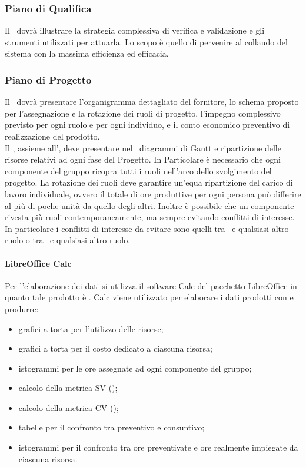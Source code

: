 \documentclass[12pt,a4paper]{article}
\begin{document}
\subsubsection{Piano di Qualifica}
Il \PdQ\ dovrà illustrare la strategia complessiva di verifica e validazione e gli strumenti utilizzati per attuarla. Lo scopo è quello di pervenire al collaudo del sistema con la massima efficienza ed efficacia.

\subsubsection{Piano di Progetto} %
Il \PdP\ dovrà presentare l'organigramma dettagliato del fornitore, lo schema proposto per l'assegnazione e la rotazione dei ruoli di progetto, l'impegno complessivo previsto per ogni ruolo e per ogni individuo, e il conto economico preventivo di realizzazione del prodotto.\\
Il \PM, assieme all'\AM, deve presentare nel \PdP\ diagrammi di Gantt e ripartizione delle risorse relativi ad ogni fase del Progetto. In Particolare è necessario che ogni componente del gruppo ricopra tutti i ruoli nell'arco dello svolgimento del progetto. La rotazione dei ruoli deve garantire un'equa ripartizione del carico di lavoro individuale, ovvero il totale di ore produttive per ogni persona può differire al più di poche unità da quello degli altri. Inoltre è possibile che un componente rivesta più ruoli contemporaneamente, ma sempre evitando conflitti di interesse. In particolare i conflitti di interesse da evitare sono quelli tra \PM\ e qualsiasi altro ruolo o tra \VR\ e qualsiasi altro ruolo.


\paragraph{LibreOffice Calc}
Per l’elaborazione dei dati si utilizza il software Calc del pacchetto LibreOffice in quanto tale prodotto è . Calc viene utilizzato per elaborare i dati prodotti con  e produrre:
\begin{itemize}
	\item grafici a torta per l’utilizzo delle risorse;
	\item grafici a torta per il costo dedicato a ciascuna risorsa;
	\item istogrammi per le ore assegnate ad ogni componente del gruppo;
	\item calcolo della metrica SV ();
	\item calcolo della metrica CV ();
	\item tabelle per il confronto tra preventivo e consuntivo;
	\item istogrammi per il confronto tra ore preventivate e ore realmente impiegate da
	ciascuna risorsa.
\end{itemize}
\end{document}
